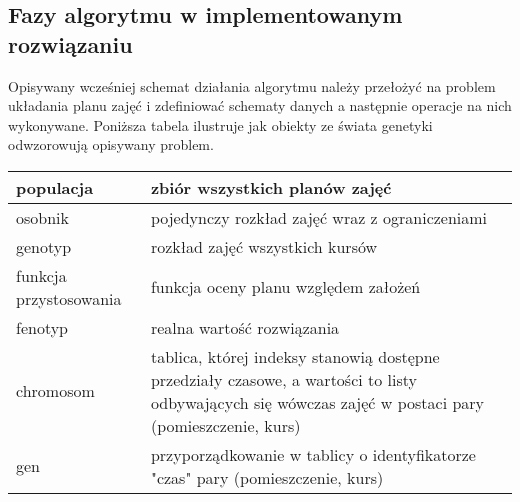 \subsection{Fazy algorytmu w implementowanym rozwiązaniu}
\par Opisywany wcześniej schemat działania algorytmu należy przełożyć na problem układania planu zajęć i zdefiniować schematy danych a następnie operacje na nich wykonywane. Poniższa tabela ilustruje jak obiekty ze świata genetyki odwzorowują opisywany problem.
\begin{center}
\begin{tabular}{| l | p{10cm} |}
\hline
populacja & zbiór wszystkich planów zajęć \\ \hline
osobnik & pojedynczy rozkład zajęć wraz z ograniczeniami \\ \hline
genotyp & rozkład zajęć wszystkich kursów \\ \hline
funkcja przystosowania & funkcja oceny planu względem założeń \\ \hline
fenotyp & realna wartość rozwiązania \\ \hline
chromosom & tablica, której indeksy stanowią dostępne przedziały czasowe, a wartości to listy odbywających się wówczas zajęć w postaci pary (pomieszczenie, kurs) \\ \hline
gen & przyporządkowanie w tablicy o identyfikatorze "czas" pary  (pomieszczenie, kurs) \\ \hline
\end{tabular}
\end{center}
